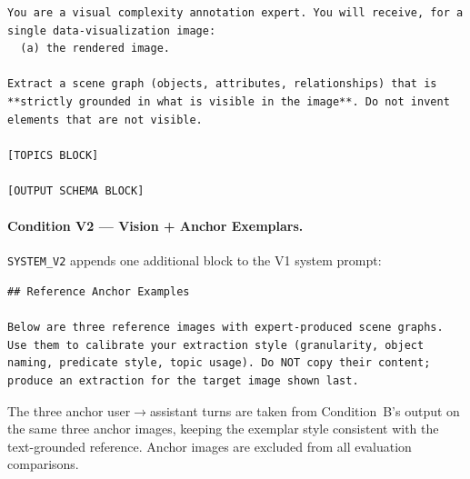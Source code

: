 \begin{lstlisting}
You are a visual complexity annotation expert. You will receive, for a single data-visualization image:
  (a) the rendered image.

Extract a scene graph (objects, attributes, relationships) that is **strictly grounded in what is visible in the image**. Do not invent elements that are not visible.

[TOPICS BLOCK]

[OUTPUT SCHEMA BLOCK]
\end{lstlisting}

\paragraph{Condition V2 --- Vision + Anchor Exemplars.}
\texttt{SYSTEM\_V2} appends one additional block to the V1 system prompt:

\begin{lstlisting}
## Reference Anchor Examples

Below are three reference images with expert-produced scene graphs. Use them to calibrate your extraction style (granularity, object naming, predicate style, topic usage). Do NOT copy their content; produce an extraction for the target image shown last.
\end{lstlisting}

\noindent The three anchor user$\to$assistant turns are taken from
Condition~B's output on the same three anchor images, keeping the
exemplar style consistent with the text-grounded reference. Anchor images
are excluded from all evaluation comparisons.

%
